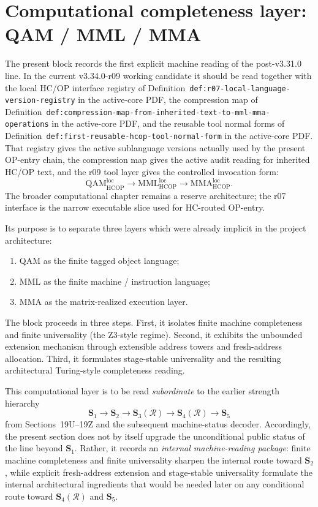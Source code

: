 \section*{Computational completeness layer: QAM / MML / MMA}

The present block records the first explicit machine reading of the post-v3.31.0 line.  
In the current v3.34.0-r09 working candidate it should be read together with the local HC/OP interface registry of Definition~\texttt{def:r07-local-language-version-registry} in the active-core PDF, the compression map of Definition~\texttt{def:compression-map-from-inherited-text-to-mml-mma-operations} in the active-core PDF, and the reusable tool normal forms of Definition~\texttt{def:first-reusable-hcop-tool-normal-form} in the active-core PDF. That registry gives the active sublanguage versions actually used by the present OP-entry chain, the compression map gives the active audit reading for inherited HC/OP text, and the r09 tool layer gives the controlled invocation form:
\[
  \mathrm{QAM}_{\mathrm{HCOP}}^{\mathrm{loc}}
  \to
  \mathrm{MML}_{\mathrm{HCOP}}^{\mathrm{loc}}
  \to
  \mathrm{MMA}_{\mathrm{HCOP}}^{\mathrm{loc}}.
\]
The broader computational chapter remains a reserve architecture; the r07 interface is the narrow executable slice used for HC-routed OP-entry.

Its purpose is to separate three layers which were already implicit in the project architecture:
\begin{enumerate}[leftmargin=2em]
  \item QAM as the finite tagged object language;
  \item MML as the finite machine / instruction language;
  \item MMA as the matrix-realized execution layer.
\end{enumerate}

The block proceeds in three steps. First, it isolates finite machine completeness and finite universality (the Z3-style regime). Second, it exhibits the unbounded extension mechanism through extensible address towers and fresh-address allocation. Third, it formulates stage-stable universality and the resulting architectural Turing-style completeness reading.

This computational layer is to be read \emph{subordinate} to the earlier strength hierarchy
\[
\mathbf S_1\to \mathbf S_2\to \mathbf S_3(\mathcal R)\to \mathbf S_4(\mathcal R)\to \mathbf S_5
\]
from Sections~19U--19Z and the subsequent machine-status decoder. Accordingly, the present section does not by itself upgrade the unconditional public status of the line beyond \(\mathbf S_1\). Rather, it records an \emph{internal machine-reading package}: finite machine completeness and finite universality sharpen the internal route toward \(\mathbf S_2\), while explicit fresh-address extension and stage-stable universality formulate the internal architectural ingredients that would be needed later on any conditional route toward \(\mathbf S_4(\mathcal R)\) and \(\mathbf S_5\).

